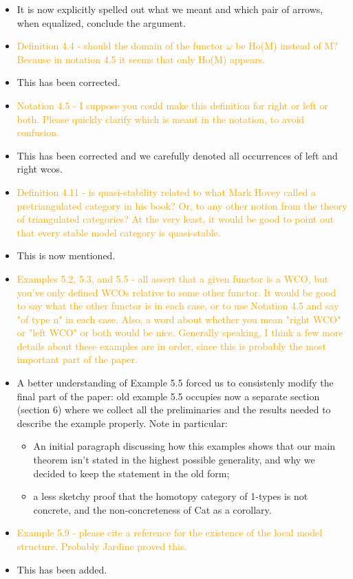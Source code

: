 \documentclass{amsart}
\begin{document}
\begin{itemize}
\item It is now explicitly spelled out what we meant and which pair of arrows, when equalized, conclude the argument.
\item \textcolor{orange}{Definition 4.4 - should the domain of the functor $\omega$ be Ho(M) instead of M? Because in notation 4.5 it seems that only Ho(M) appears.}
\item This has been corrected.
\item \textcolor{orange}{Notation 4.5 - I suppose you could make this definition for right or left or both. Please quickly clarify which is meant in the notation, to avoid confusion.}
\item This has been corrected and we carefully denoted all occurrences of left and right wcos.
\item \textcolor{orange}{Definition 4.11 - is quasi-stability related to what Mark Hovey called a pretriangulated category in his book? Or, to any other notion from the theory of triangulated categories? At the very least, it would be good to point out that every stable model category is quasi-stable.}
\item This is now mentioned.
\item \textcolor{orange}{Examples 5.2, 5.3, and 5.5 - all assert that a given functor is a WCO, but you've only defined WCOs relative to some other functor. It would be good to say what the other functor is in each case, or to use Notation 4.5 and say "of type n" in each case. Also, a word about whether you mean "right WCO" or "left WCO" or both would be nice. Generally speaking, I think a few more details about these examples are in order, since this is probably the most important part of the paper.}
\item A better understanding of Example 5.5 forced us to consistenly modify the final part of the paper: old example 5.5 occupies now a separate section (section 6) where we collect all the preliminaries and the results needed to describe the example properly. Note in particular:
\begin{itemize}
	\item An initial paragraph discussing how this examples shows that our main theorem isn't stated in the highest possible generality, and why we decided to keep the statement in the old form;
	\item a less sketchy proof that the homotopy category of 1-types is not concrete, and the non-concreteness of Cat as a corollary.
\end{itemize}
\item \textcolor{orange}{Example 5.9 - please cite a reference for the existence of the local model structure. Probably Jardine proved this.}
\item This has been added.
\end{itemize}
\end{document}
